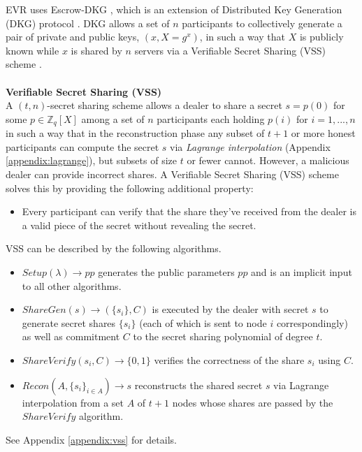 \documentclass[letterpaper,twocolumn,10pt]{article}
\theoremstyle{definition}
\theoremstyle{remark}
\begin{document}
EVR uses Escrow-DKG \cite{david2019rational}, which is an extension of Distributed Key Generation (DKG) protocol \cite{gennaro1999secure, gennaro3revisiting}. DKG allows a set of $n$ participants to collectively generate a pair of private and public keys, $(x,X = g^x )$, in such a way that $X$ is publicly known while $x$ is shared by $n$ servers via a Verifiable Secret Sharing (VSS) scheme \cite{feldman1987practical, pedersen1991non}.\\\\
\textbf{Verifiable Secret Sharing (VSS)}\\
A $(t, n)$-secret sharing scheme \cite{shamir1979share, blakley1979safeguarding} allows a dealer to share a secret $s = p(0)$ for some $p \in \mathbb{Z}_q[X]$ among a set of $n$ participants each holding $p(i)$ for $i = 1, ..., n$ in such a way that in the reconstruction phase any subset of $t+1$ or more honest participants can compute the secret $s$ via \textit{Lagrange interpolation} (Appendix \ref{appendix:lagrange}), but subsets of size $t$ or fewer cannot. However, a malicious dealer can provide incorrect shares. A Verifiable Secret Sharing (VSS) scheme solves this by providing the following additional property:
\begin{itemize}
    \item Every participant can verify that the share they've received from the dealer is a valid piece of the secret without revealing the secret.
\end{itemize}
VSS can be described by the following algorithms.
\begin{itemize}
    \item $Setup(\lambda) \rightarrow pp$ generates the public parameters $pp$ and is an implicit input to all other algorithms.
    \item $ShareGen(s) \rightarrow (\{s_i\}, C)$ is executed by the dealer with secret $s$ to generate secret shares $\{s_i\}$ (each of which is sent to node $i$ correspondingly) as well as commitment $C$ to the secret sharing polynomial of degree $t$.
    \item $ShareVerify(s_i, C) \rightarrow \{0, 1\}$ verifies the correctness of the share $s_i$ using $C$.
    \item $Recon(A, \{s_i\}_{i \in A}) \rightarrow s$ reconstructs the shared secret $s$ via Lagrange interpolation from a set $A$ of $t + 1$ nodes whose shares are passed by the $ShareVerify$ algorithm.
\end{itemize}
See Appendix \ref{appendix:vss} for details.\\\\
\end{document}
